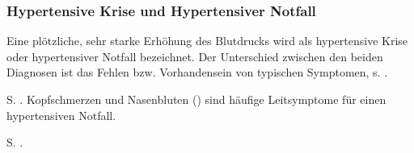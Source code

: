 \subsubsection{Hypertensive Krise und Hypertensiver Notfall}
\label{topic:hypertensive-krise}
\label{topic:hypertensiver-notfall}

{
Eine plötzliche, sehr starke Erhöhung des Blutdrucks wird als hypertensive
Krise oder hypertensiver Notfall bezeichnet. Der Unterschied zwischen den
beiden Diagnosen ist das Fehlen bzw. Vorhandensein von typischen Symptomen, s.
.

}{}{}{}{}

{
S. . Kopfschmerzen und Nasenbluten
() sind häufige Leitsymptome für einen
hypertensiven Notfall. 

}{
S. .
}{}{}{}

